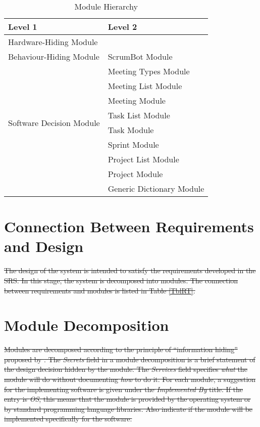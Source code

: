 \documentclass[12pt, titlepage]{article}
\begin{document}
\begin{table}[h!]
\centering
\begin{tabular}{p{} p{}}
\toprule
\textbf{Level 1} & \textbf{Level 2}\\
\midrule

{Hardware-Hiding Module} & ~ \\
\midrule

\multirow{1}{0.3\textwidth}{Behaviour-Hiding Module} 
& ScrumBot Module\\         %
\midrule

\multirow{8}{0.3\textwidth}{Software Decision Module} 
& Meeting Types Module\\    %
& Meeting List Module\\     %
& Meeting Module\\          %
& Task List Module\\        %
& Task Module\\             %
& Sprint Module\\           %
& Project List Module\\     %
& Project Module\\          %
& Generic Dictionary Module\\   %
\bottomrule

\end{tabular}
\caption{Module Hierarchy}
\label{TblMH}
\end{table}

\section{Connection Between Requirements and Design} \label{SecConnection}

\sout{The design of the system is intended to satisfy the requirements developed in the SRS. In this stage, the system is decomposed into modules. The connection between requirements and modules is listed in Table \ref{TblRT}.}

\section{Module Decomposition} \label{SecMD}
\sout{Modules are decomposed according to the principle of ``information hiding'' proposed by \mbox{\citet{ParnasEtAl1984}}. The \emph{Secrets} field in a module decomposition is a brief statement of the design decision hidden by the module. The \emph{Services} field specifies \emph{what} the module will do without documenting \emph{how} to do it. For each module, a suggestion for the implementing software is given under the \emph{Implemented By} title. If the entry is \emph{OS}, this means that the module is provided by the operating system or by standard programming language libraries.  Also indicate if the module will be implemented specifically for the software.}
\end{document}
